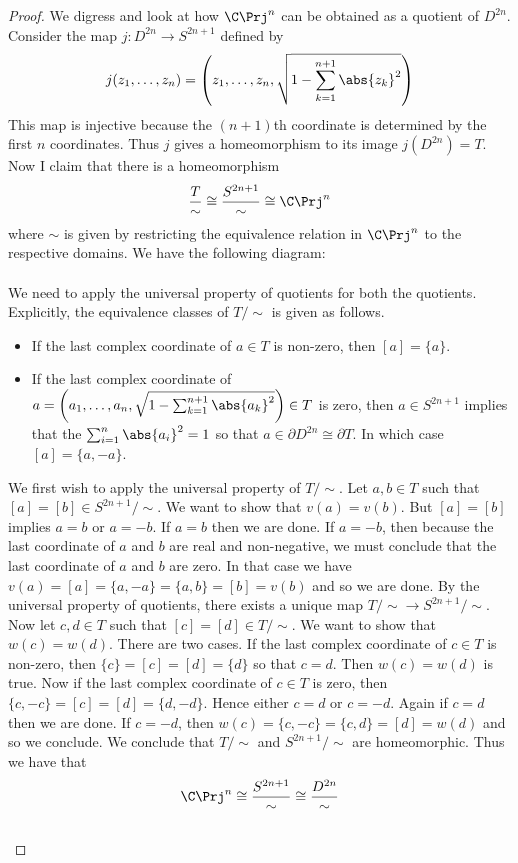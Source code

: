 \documentclass[a4paper]{article}
\begin{document}
\begin{prp}{}{}
\begin{proof}
We digress and look at how $\C\Prj^n$ can be obtained as a quotient of $D^{2n}$. Consider the map $j:D^{2n}\to S^{2n+1}$ defined by $$j(z_1,\dots,z_n)=\left(z_1,\dots,z_n,\sqrt{1-\sum_{k=1}^{n+1}\abs{z_k}^2}\right)$$ This map is injective because the $(n+1)$th coordinate is determined by the first $n$ coordinates. Thus $j$ gives a homeomorphism to its image $j(D^{2n})=T$. Now I claim that there is a homeomorphism $$\frac{T}{\sim}\cong\frac{S^{2n+1}}{\sim}\cong\C\Prj^n$$ where $\sim$ is given by restricting the equivalence relation in $\C\Prj^n$ to the respective domains. We have the following diagram: \\
\\
We need to apply the universal property of quotients for both the quotients. Explicitly, the equivalence classes of $T/\sim$ is given as follows. 
\begin{itemize}
\item If the last complex coordinate of $a\in T$ is non-zero, then $[a]=\{a\}$. 
\item If the last complex coordinate of $a=\left(a_1,\dots,a_n,\sqrt{1-\sum_{k=1}^{n+1}\abs{a_k}^2}\right)\in T$ is zero, then $a\in S^{2n+1}$ implies that the $\sum_{i=1}^n\abs{a_i}^2=1$ so that $a\in\partial D^{2n}\cong\partial T$. In which case $[a]=\{a,-a\}$. 
\end{itemize}
We first wish to apply the universal property of $T/\sim$. Let $a,b\in T$ such that $[a]=[b]\in S^{2n+1}/\sim$. We want to show that $v(a)=v(b)$. But $[a]=[b]$ implies $a=b$ or $a=-b$. If $a=b$ then we are done. If $a=-b$, then because the last coordinate of $a$ and $b$ are real and non-negative, we must conclude that the last coordinate of $a$ and $b$ are zero. In that case we have $v(a)=[a]=\{a,-a\}=\{a,b\}=[b]=v(b)$ and so we are done. By the universal property of quotients, there exists a unique map $T/\sim\to S^{2n+1}/\sim$. Now let $c,d\in T$ such that $[c]=[d]\in T/\sim$. We want to show that $w(c)=w(d)$. There are two cases. If the last complex coordinate of $c\in T$ is non-zero, then $\{c\}=[c]=[d]=\{d\}$ so that $c=d$. Then $w(c)=w(d)$ is true. Now if the last complex coordinate of $c\in T$ is zero, then $\{c,-c\}=[c]=[d]=\{d,-d\}$. Hence either $c=d$ or $c=-d$. Again if $c=d$ then we are done. If $c=-d$, then $w(c)=\{c,-c\}=\{c,d\}=[d]=w(d)$ and so we conclude. We conclude that $T/\sim$ and $S^{2n+1}/\sim$ are homeomorphic. Thus we have that $$\C\Prj^n\cong\frac{S^{2n+1}}{\sim}\cong\frac{D^{2n}}{\sim}$$~\\


\end{proof}
\end{prp}
\end{document}

